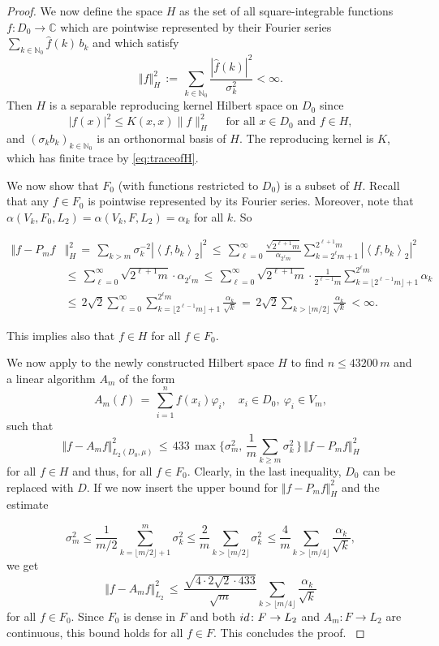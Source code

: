 \documentclass[a4paper,12pt]{amsart}
\theoremstyle{definition}
\theoremstyle{remark}
\newcommand{\abs}[1]{\left|#1\right|}
\newcommand{\ipr}[2]{\left\langle#1,#2\right\rangle}
\begin{document}
\begin{proof}
{We now define the space $H$ as the set of all square-integrable functions $f\colon D_0 \to \mathbb{C}$
which are pointwise represented by their Fourier series
$\sum_{{k\in \mathbb{N}_0}} \hat f (k) \, b_k$
and which satisfy
\[
 \Vert f \Vert_H^2 \,:=\, \sum_{k\in\mathbb{N}_0} \frac{|\hat f(k)|^2}{\sigma_k^2} < \infty.
\]
Then $H$ is a separable reproducing kernel Hilbert space on $D_0$
since
\[
|f(x)|^2\leq K(x,x)\|f\|_H^2\quad\text{ for all }x\in D_0\text{ and }f\in H,
\]
and $(\sigma_k b_k)_{k\in\mathbb{N}_0}$ is an orthonormal basis of $H$.
The reproducing kernel is $K$, which
has finite trace by \eqref{eq:traceofH}.

We now show that $F_0$ (with functions restricted to $D_0$) is a subset of $H$.
Recall that any $f\in F_0$ is pointwise represented by its Fourier series. Moreover,
note that $\alpha(V_k,F_0, L_2)=\alpha(V_k,F, L_2)=\alpha_k$  for all $k$.
So}
\[ 
\begin{split}     
	\Vert f - P_m f &\Vert^2_H 
	\,=\, \sum_{k > m} \sigma_k^{-2} \abs{\ipr{f}{b_k}_2}^2 
	\,\le\, \sum_{ \ell  =0}^\infty \frac{\sqrt{2^{\ell+1}m}}{\alpha_{2^{\ell}m}} 
	\sum_{k= 2^{\ell}m +1}^{2^{\ell+1}m}  \abs{\ipr{f}{b_k}_2}^2\\
	&\le\, \sum_{ \ell  =0}^\infty \sqrt{2^{\ell+1}m} \cdot \alpha_{2^{\ell}m}
	\,\le\, \sum_{ \ell  =0}^\infty \sqrt{2^{\ell+1}m} \cdot \frac{1}{2^{\ell-1}m} \sum_{k=\lfloor 2^{\ell-1}m\rfloor+1}^{2^\ell m} \alpha_k\\
	&\le\, 2\sqrt2 \sum_{ \ell  =0}^\infty \sum_{k=\lfloor 2^{\ell-1}m\rfloor+1}^{2^\ell m} \frac{ \alpha_k}{\sqrt{k}}
	\,=\, 2\sqrt2 \sum_{k> \lfloor m/2\rfloor} \frac{ \alpha_k}{\sqrt{k}} \,< \infty.
	\end{split}
\]
{This implies also that $f\in H$ for all $f\in F_0$.


We now apply \cite[Theorem~23]{DKU}
to the newly constructed Hilbert space $H$ to
find $n\le 43200\,m$ and a linear algorithm $A_m$ of the form
\[
 A_m(f) \,=\, \sum_{i=1}^n f(x_i) \varphi_i, \quad x_i \in D_0, \ \varphi_i \in V_m,
\]
such that
\begin{equation*}%
 \Vert f - A_m f \Vert_{L_2(D_0,\mu)}^2 
 \,\le\, 433 \,
\max\bigg\{\sigma_m^2, \, \frac{1}{m}\sum_{k\geq m}\sigma_k^2 \, \bigg\}
\, \Vert f - P_m f \Vert_{H}^2
\end{equation*}
for all $f\in H$ and thus, for all $f\in F_0$.
Clearly, in the last inequality, $D_0$ can be replaced with $D$.
If we now insert the upper bound for $\Vert f - P_m f\Vert_H^2$ and the estimate}
$$
\sigma_m^2 \leq \frac{1}{m/2} \sum_{k =  \lfloor m/2\rfloor+1 }^m \sigma_k^2 \leq \frac{2}{m} \sum_{k >  \lfloor m/2\rfloor  } \sigma_k^2
\,\leq \frac{4}{m} \sum_{k > \lfloor m/4 \rfloor} \frac{\alpha_k}{\sqrt k},
$$
we get
\[
 \Vert f - A_m f \Vert_{L_2}^2 
 \,\le\, \frac{\sqrt{4\cdot 2\sqrt2 \cdot 433}}{\sqrt{m}}\sum_{k > \lfloor m/4 \rfloor} \frac{ \alpha_k}{\sqrt{k}}
\]
for {all $f\in F_0$.
Since $F_0$ is dense in $F$ and
both ${\rm id} \colon F \to L_2$ and $A_m \colon F \to L_2$
are continuous,
this bound holds for all $f\in F$. 
This concludes the proof.
}
\end{proof}
\end{document}

